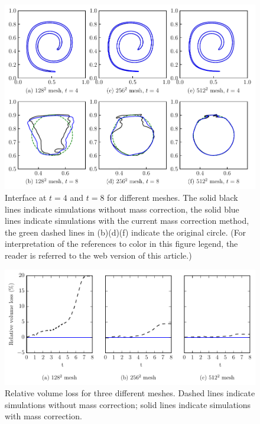 \begin{figure}[t]
\centering
  \includegraphics[width=.9\columnwidth]{Figures/serp_shape.pdf}
   \caption{Interface at $t=4$ and $t=8$ for different meshes. The solid black lines indicate simulations without mass correction, the solid blue lines indicate simulations with the current mass correction method, the green dashed lines in (b)(d)(f) indicate the original circle. (For interpretation of the references to color in this figure legend, the reader is referred to the web version of this article.)}
   \label{fig:serpentine}
\end{figure}

\begin{figure}[t]
 \begin{center}
 \includegraphics[width=\columnwidth]{Figures/serp_loss.pdf}
 \end{center}
 \caption{Relative volume loss for three different meshes. Dashed lines indicate simulations without mass correction; solid lines indicate simulations with mass correction.}
 \label{fig: massloss}
\end{figure}

